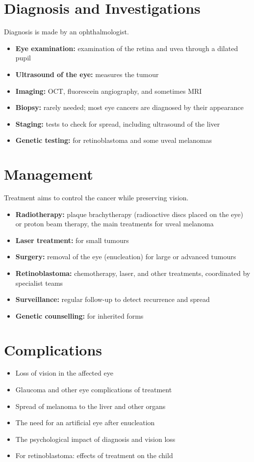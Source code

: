 \section*{Diagnosis and Investigations}
Diagnosis is made by an ophthalmologist.
\begin{itemize}
    \item \textbf{Eye examination:} examination of the retina and uvea through a dilated pupil
    \item \textbf{Ultrasound of the eye:} measures the tumour
    \item \textbf{Imaging:} OCT, fluorescein angiography, and sometimes MRI
    \item \textbf{Biopsy:} rarely needed; most eye cancers are diagnosed by their appearance
    \item \textbf{Staging:} tests to check for spread, including ultrasound of the liver
    \item \textbf{Genetic testing:} for retinoblastoma and some uveal melanomas
\end{itemize}

\section*{Management}
Treatment aims to control the cancer while preserving vision.
\begin{itemize}
    \item \textbf{Radiotherapy:} plaque brachytherapy (radioactive discs placed on the eye) or proton beam therapy, the main treatments for uveal melanoma
    \item \textbf{Laser treatment:} for small tumours
    \item \textbf{Surgery:} removal of the eye (enucleation) for large or advanced tumours
    \item \textbf{Retinoblastoma:} chemotherapy, laser, and other treatments, coordinated by specialist teams
    \item \textbf{Surveillance:} regular follow-up to detect recurrence and spread
    \item \textbf{Genetic counselling:} for inherited forms
\end{itemize}

\section*{Complications}
\begin{itemize}
    \item Loss of vision in the affected eye
    \item Glaucoma and other eye complications of treatment
    \item Spread of melanoma to the liver and other organs
    \item The need for an artificial eye after enucleation
    \item The psychological impact of diagnosis and vision loss
    \item For retinoblastoma: effects of treatment on the child
\end{itemize}

